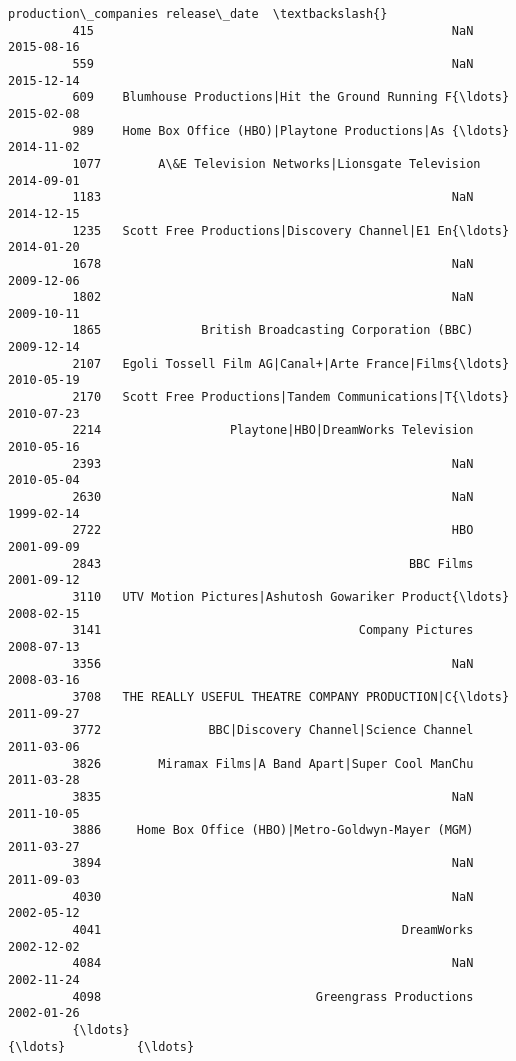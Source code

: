 \documentclass[11pt]{article}
\begin{document}
\begin{Verbatim}[commandchars=\\\{\}]
                                             production\_companies release\_date  \textbackslash{}
         415                                                  NaN   2015-08-16   
         559                                                  NaN   2015-12-14   
         609    Blumhouse Productions|Hit the Ground Running F{\ldots}   2015-02-08   
         989    Home Box Office (HBO)|Playtone Productions|As {\ldots}   2014-11-02   
         1077        A\&E Television Networks|Lionsgate Television   2014-09-01   
         1183                                                 NaN   2014-12-15   
         1235   Scott Free Productions|Discovery Channel|E1 En{\ldots}   2014-01-20   
         1678                                                 NaN   2009-12-06   
         1802                                                 NaN   2009-10-11   
         1865              British Broadcasting Corporation (BBC)   2009-12-14   
         2107   Egoli Tossell Film AG|Canal+|Arte France|Films{\ldots}   2010-05-19   
         2170   Scott Free Productions|Tandem Communications|T{\ldots}   2010-07-23   
         2214                  Playtone|HBO|DreamWorks Television   2010-05-16   
         2393                                                 NaN   2010-05-04   
         2630                                                 NaN   1999-02-14   
         2722                                                 HBO   2001-09-09   
         2843                                           BBC Films   2001-09-12   
         3110   UTV Motion Pictures|Ashutosh Gowariker Product{\ldots}   2008-02-15   
         3141                                    Company Pictures   2008-07-13   
         3356                                                 NaN   2008-03-16   
         3708   THE REALLY USEFUL THEATRE COMPANY PRODUCTION|C{\ldots}   2011-09-27   
         3772               BBC|Discovery Channel|Science Channel   2011-03-06   
         3826        Miramax Films|A Band Apart|Super Cool ManChu   2011-03-28   
         3835                                                 NaN   2011-10-05   
         3886     Home Box Office (HBO)|Metro-Goldwyn-Mayer (MGM)   2011-03-27   
         3894                                                 NaN   2011-09-03   
         4030                                                 NaN   2002-05-12   
         4041                                          DreamWorks   2002-12-02   
         4084                                                 NaN   2002-11-24   
         4098                              Greengrass Productions   2002-01-26   
         {\ldots}                                                  {\ldots}          {\ldots}   

\end{Verbatim}
\end{document}
